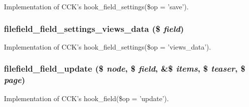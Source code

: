 Implementation of CCK's hook\_\-field\_\-settings(\$op = 'save'). \hypertarget{filefield__field_8inc_735b23726b4588e308eac69da0533a19}{
\subsubsection[{filefield\_\-field\_\-settings\_\-views\_\-data}]{\setlength{\rightskip}{0pt plus 5cm}filefield\_\-field\_\-settings\_\-views\_\-data (\$ {\em field})}}
\label{filefield__field_8inc_735b23726b4588e308eac69da0533a19}


Implementation of CCK's hook\_\-field\_\-settings(\$op = 'views\_\-data'). \hypertarget{filefield__field_8inc_abf42e1b91a512b7155b5f288988a430}{
\subsubsection[{filefield\_\-field\_\-update}]{\setlength{\rightskip}{0pt plus 5cm}filefield\_\-field\_\-update (\$ {\em node}, \/  \$ {\em field}, \/  \&\$ {\em items}, \/  \$ {\em teaser}, \/  \$ {\em page})}}
\label{filefield__field_8inc_abf42e1b91a512b7155b5f288988a430}


Implementation of CCK's hook\_\-field(\$op = 'update'). 